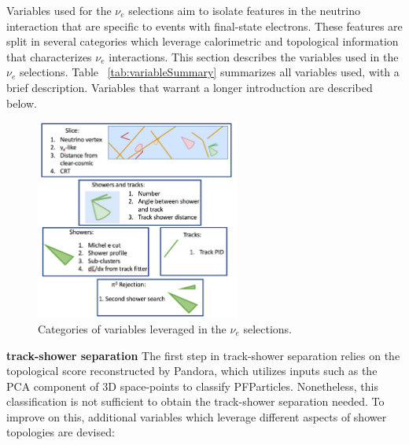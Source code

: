 

\par Variables used for the $\nu_e$ selections aim to isolate features in the neutrino interaction that are specific to events with final-state electrons. These features are split in several categories which leverage calorimetric and topological information that characterizes $\nu_e$ interactions. This section describes the variables used in the $\nu_e$ selections. Table ~\ref{tab:variableSummary} summarizes all variables used, with a brief description. Variables that warrant a longer introduction are described below.





\begin{figure}[H]
\begin{center}
\includegraphics[width=0.6\textwidth]{nueselection/tools.png}
\caption{\label{fig:nue:variables}Categories of variables leveraged in the $\nu_e$ selections.}
\end{center}
\end{figure}

\par \noindent \textbf{track-shower separation} The first step in track-shower separation relies on the topological score reconstructed by Pandora, which utilizes inputs such as the PCA component of 3D space-points to classify PFParticles. Nonetheless, this classification is not sufficient to obtain the track-shower separation needed. To improve on this, additional variables which leverage different aspects of shower topologies are devised:

